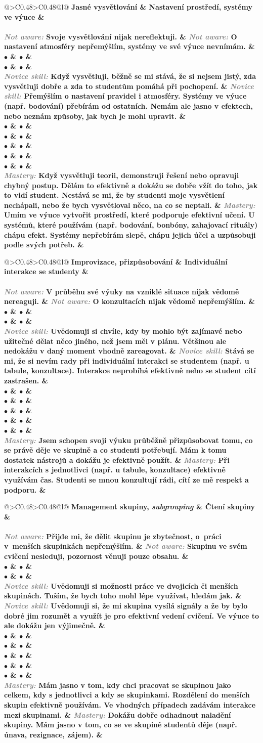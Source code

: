 \documentclass[twoside,openany,10pt]{book}
\makeatletter
\newcommand{\note}[1]{\textcolor{gray}{\small\itshape #1}}
\newcommand{\rubricpage}[8]{
\newpage
\begin{tabular}{@{}>{\small}C{0.48\textwidth}>{\small}C{0.48\textwidth}@{}l@{}}
\normalsize \bfseries #1 & \normalsize \bfseries #5 & \\[1em] \hline \\[-1.2em]
	\justify \note{Not aware:} #2 & \justify \note{Not aware:} #6 & \\[2em]
$\bullet$ & $\bullet$ & \\
$\bullet$ & $\bullet$ & \\
\justify \note{Novice skill:} #3 & \justify \note{Novice skill:} #7 & \\[3em]
$\bullet$ & $\bullet$ & \\
$\bullet$ & $\bullet$ & \\
$\bullet$ & $\bullet$ & \\
$\bullet$ & $\bullet$ & \\
$\bullet$ & $\bullet$ & \\
\justify \note{Mastery:} #4 & \justify \note{Mastery:} #8 &
\end{tabular}
}
\makeatother
\begin{document}
\rubricpage{Jasné vysvětlování}
{Svoje vysvětlování nijak nereflektuji.}
{Když vysvětluji, běžně se mi stává, že si nejsem jistý, zda vysvětluji dobře a zda to studentům pomáhá při pochopení.}
{Když vysvětluji teorii, demonstruji řešení nebo opravuji chybný postup. Dělám to efektivně a dokážu se dobře vžít do toho, jak to vidí student. Nestává se mi, že by studenti moje vysvětlení nechápali, nebo že bych vysvětloval něco, na co se neptali.}
{Nastavení prostředí, systémy ve výuce}
{O nastavení atmosféry nepřemýšlím, systémy ve své výuce nevnímám.}
{Přemýšlím o nastavení pravidel i atmosféry. Systémy ve výuce (např. bodování) přebírám od ostatních. Nemám ale jasno v efektech, nebo neznám způsoby, jak bych je mohl upravit.}
{Umím ve výuce vytvořit prostředí, které podporuje efektivní učení. U systémů, které používám (např. bodování, bonbóny, zahajovací rituály) chápu efekt. Systémy nepřebírám slepě, chápu jejich účel a uzpůsobuji podle svých potřeb.}

\rubricpage{Improvizace, přizpůsobování}
{V průběhu své výuky na vzniklé situace nijak vědomě nereaguji.}
{Uvědomuji si chvíle, kdy by mohlo být zajímavé nebo užitečné dělat něco jiného, než jsem měl v plánu. Většinou ale nedokážu v daný moment vhodně zareagovat.}
{Jsem schopen svoji výuku průběžně přizpůsobovat tomu, co se právě děje ve skupině a co studenti potřebují. Mám k tomu dostatek nástrojů a dokážu je efektivně použít.}
{Individuální interakce se studenty}
{O konzultacích nijak vědomě nepřemýšlím.}
{Stává se mi, že si nevím rady při individuální interakci se studentem (např. u tabule, konzultace). Interakce neprobíhá efektivně nebo se student cítí zastrašen.}
{Při interakcích s jednotlivci (např. u tabule, konzultace) efektivně využívám čas. Studenti se mnou konzultují rádi, cítí ze mě respekt a podporu.}

\rubricpage{Management skupiny, \textit{subgrouping}}
{Přijde mi, že dělit skupinu je zbytečnost, o~práci v~menších skupinkách nepřemýšlím.}
{Uvědomuji si možnosti práce ve dvojicích či menších skupinách. Tuším, že bych toho mohl lépe využívat, hledám jak.}
{Mám jasno v tom, kdy chci pracovat se skupinou jako celkem, kdy s jednotlivci a kdy se skupinkami. Rozdělení do menších skupin efektivně používám. Ve vhodných případech zadávám interakce mezi skupinami.}
{Čtení skupiny}
{Skupinu ve svém cvičení nesleduji, pozornost věnuji pouze obsahu.}
{Uvědomuji si, že mi skupina vysílá signály a že by bylo dobré jim rozumět a využít je pro efektivní vedení cvičení. Ve výuce to ale dokážu jen výjimečně.}
{Dokážu dobře odhadnout naladění skupiny. Mám jasno v tom, co se ve skupině studentů děje (např. únava, rezignace, zájem).}
\end{document}

